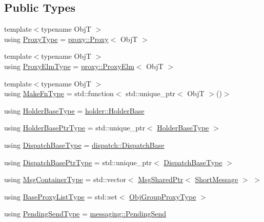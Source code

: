 \subsection*{Public Types}
\begin{DoxyCompactItemize}
\item 
{\footnotesize template$<$typename ObjT $>$ }\\using \hyperlink{structvt_1_1objgroup_1_1_obj_group_manager_aea65eef52f240a52210132eef5ce591f}{Proxy\+Type} = \hyperlink{structvt_1_1objgroup_1_1proxy_1_1_proxy}{proxy\+::\+Proxy}$<$ ObjT $>$
\item 
{\footnotesize template$<$typename ObjT $>$ }\\using \hyperlink{structvt_1_1objgroup_1_1_obj_group_manager_adba6c8ecb0f4c30e719f1abb995cfc9b}{Proxy\+Elm\+Type} = \hyperlink{structvt_1_1objgroup_1_1proxy_1_1_proxy_elm}{proxy\+::\+Proxy\+Elm}$<$ ObjT $>$
\item 
{\footnotesize template$<$typename ObjT $>$ }\\using \hyperlink{structvt_1_1objgroup_1_1_obj_group_manager_a397d787b3876752a6d70511b2769b872}{Make\+Fn\+Type} = std\+::function$<$ std\+::unique\+\_\+ptr$<$ ObjT $>$()$>$
\item 
using \hyperlink{structvt_1_1objgroup_1_1_obj_group_manager_a4898fc9cabf44890e5593f8c4ab86230}{Holder\+Base\+Type} = \hyperlink{structvt_1_1objgroup_1_1holder_1_1_holder_base}{holder\+::\+Holder\+Base}
\item 
using \hyperlink{structvt_1_1objgroup_1_1_obj_group_manager_ac1e9bb19d4a5923dd6d595bad28f04c9}{Holder\+Base\+Ptr\+Type} = std\+::unique\+\_\+ptr$<$ \hyperlink{structvt_1_1objgroup_1_1_obj_group_manager_a4898fc9cabf44890e5593f8c4ab86230}{Holder\+Base\+Type} $>$
\item 
using \hyperlink{structvt_1_1objgroup_1_1_obj_group_manager_ae89a82f6bfca9bbd007791f1cac88f8f}{Dispatch\+Base\+Type} = \hyperlink{structvt_1_1objgroup_1_1dispatch_1_1_dispatch_base}{dispatch\+::\+Dispatch\+Base}
\item 
using \hyperlink{structvt_1_1objgroup_1_1_obj_group_manager_a8f2ded4cfa63faa119c2bd550764878f}{Dispatch\+Base\+Ptr\+Type} = std\+::unique\+\_\+ptr$<$ \hyperlink{structvt_1_1objgroup_1_1_obj_group_manager_ae89a82f6bfca9bbd007791f1cac88f8f}{Dispatch\+Base\+Type} $>$
\item 
using \hyperlink{structvt_1_1objgroup_1_1_obj_group_manager_ab89e17bd301b2aa684fce22f0b4af30a}{Msg\+Container\+Type} = std\+::vector$<$ \hyperlink{namespacevt_ab2b3d506ec8e8d1540aede826d84a239}{Msg\+Shared\+Ptr}$<$ \hyperlink{namespacevt_a1125ac1da6c0bbf141e0ea0739d7602d}{Short\+Message} $>$ $>$
\item 
using \hyperlink{structvt_1_1objgroup_1_1_obj_group_manager_a497383a759f7426e824b4f7475b3d5d3}{Base\+Proxy\+List\+Type} = std\+::set$<$ \hyperlink{namespacevt_ad7cae989df485fccca57f0792a880a8e}{Obj\+Group\+Proxy\+Type} $>$
\item 
using \hyperlink{structvt_1_1objgroup_1_1_obj_group_manager_a4f82f640edf670ba5a282074e5710921}{Pending\+Send\+Type} = \hyperlink{structvt_1_1messaging_1_1_pending_send}{messaging\+::\+Pending\+Send}
\end{DoxyCompactItemize}

